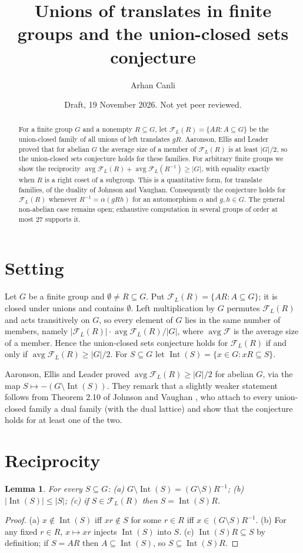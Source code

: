 \documentclass[11pt]{amsart}
\title{Unions of translates in finite groups and the union-closed sets conjecture}
\author{Arhan Canli}
\date{Draft, 19 November 2026. Not yet peer reviewed.}
\newtheorem{lemma}[theorem]{Lemma}
\theoremstyle{remark}
\newcommand{\Int}{\operatorname{Int}}
\newcommand{\avg}{\operatorname{avg}}
\begin{document}
\begin{abstract}
For a finite group $G$ and a nonempty $R\subseteq G$, let $\mathcal F_L(R)=\{AR: A\subseteq G\}$ be the union-closed family of all
unions of left translates $gR$. Aaronson, Ellis and Leader proved that for abelian $G$ the average size of a member of
$\mathcal F_L(R)$ is at least $|G|/2$, so the union-closed sets conjecture holds for these families. For arbitrary finite groups we
show the reciprocity $\avg \mathcal F_L(R)+\avg \mathcal F_L(R^{-1})\ge |G|$, with equality exactly when $R$ is a right coset of a
subgroup. This is a quantitative form, for translate families, of the duality of Johnson and Vaughan. Consequently the conjecture
holds for $\mathcal F_L(R)$ whenever $R^{-1}=\alpha(gRh)$ for an automorphism $\alpha$ and $g,h\in G$. The general non-abelian case
remains open; exhaustive computation in several groups of order at most $27$ supports it.
\end{abstract}
\maketitle

\section{Setting}
Let $G$ be a finite group and $\emptyset\ne R\subseteq G$. Put $\mathcal F_L(R)=\{AR:A\subseteq G\}$; it is closed under unions and
contains $\emptyset$. Left multiplication by $G$ permutes $\mathcal F_L(R)$ and acts transitively on $G$, so every element of $G$
lies in the same number of members, namely $|\mathcal F_L(R)|\cdot\avg\mathcal F_L(R)/|G|$, where $\avg\mathcal F$ is the average
size of a member. Hence the union-closed sets conjecture holds for $\mathcal F_L(R)$ if and only if $\avg\mathcal F_L(R)\ge|G|/2$.
For $S\subseteq G$ let $\Int(S)=\{x\in G: xR\subseteq S\}$.

Aaronson, Ellis and Leader \cite{AEL} proved $\avg\mathcal F_L(R)\ge |G|/2$ for abelian $G$, via the map
$S\mapsto -(G\setminus\Int(S))$. They remark that a slightly weaker statement follows from Theorem 2.10 of Johnson and Vaughan
\cite{JV}, who attach to every union-closed family a dual family (with the dual lattice) and show that the conjecture holds for
at least one of the two.

\section{Reciprocity}
\begin{lemma}\label{lem:basic}
For every $S\subseteq G$: (a) $G\setminus\Int(S)=(G\setminus S)R^{-1}$; (b) $|\Int(S)|\le|S|$; (c) if $S\in\mathcal F_L(R)$ then
$S=\Int(S)R$.
\end{lemma}
\begin{proof}
(a) $x\notin\Int(S)$ iff $xr\notin S$ for some $r\in R$ iff $x\in(G\setminus S)R^{-1}$. (b) For any fixed $r\in R$, $x\mapsto xr$
injects $\Int(S)$ into $S$. (c) $\Int(S)R\subseteq S$ by definition; if $S=AR$ then $A\subseteq\Int(S)$, so $S\subseteq\Int(S)R$.
\end{proof}
\end{document}
